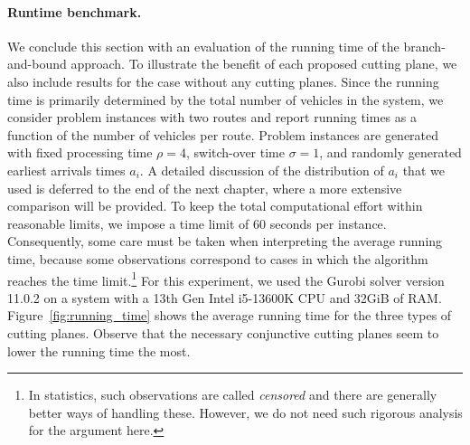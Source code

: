 \documentclass[a4paper]{report}
\theoremstyle{definition}
\theoremstyle{plain}
\begin{document}
\paragraph{Runtime benchmark.}

We conclude this section with an evaluation of the running time of the
branch-and-bound approach. To illustrate the benefit of each proposed cutting
plane, we also include results for the case without any cutting planes.
%
Since the running time is primarily determined by the total number of vehicles
in the system, we consider problem instances with two routes and report
running times as a function of the number of vehicles per route.
%
Problem instances are generated with fixed processing time $\rho=4$, switch-over
time $\sigma=1$, and randomly generated earliest arrivals times $a_i$.
%
A detailed discussion of the distribution of $a_i$ that we used is deferred to
the end of the next chapter, where a more extensive comparison will be provided.
%
To keep the total computational effort within reasonable limits, we impose a
time limit of 60 seconds per instance.
%
Consequently, some care must be taken when interpreting the average running
time, because some observations correspond to cases in which the algorithm
reaches the time limit.\footnote{In statistics, such observations are called \emph{censored}
  and there are generally better ways of handling these. However, we do not need
  such rigorous analysis for the argument here.} For this experiment, we used
the Gurobi solver version 11.0.2 on a system with a 13th Gen Intel i5-13600K CPU
and 32GiB of RAM.
%
Figure~\ref{fig:running_time} shows the average running time for the three types of cutting planes.
Observe that the necessary conjunctive cutting planes seem to lower the running
time the most.
\end{document}
